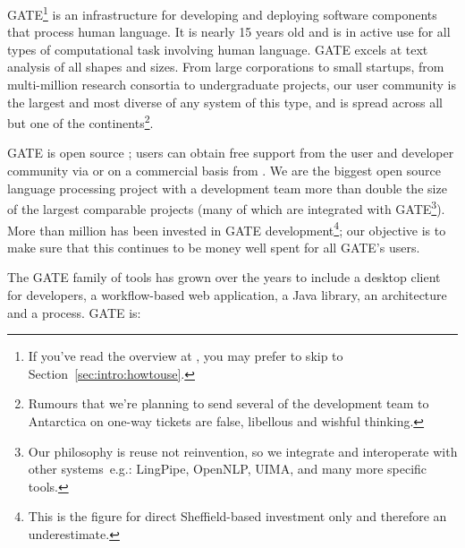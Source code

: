 GATE\footnote{If you've read
the overview at , 
you may prefer to skip to Section~\ref{sec:intro:howtouse}.} is an
infrastructure for developing and deploying software components that
process human language. It is nearly 15 years old and is in active use
for all types of computational task involving human language. GATE
excels at text analysis of all shapes and sizes. From large
corporations to small startups, from \texteuro multi-million research
consortia to undergraduate projects, our user community is the largest
and most diverse of any system of this type, and is spread across all
but one of the continents\footnote{Rumours that we're planning to send
several of the development team to Antarctica on one-way tickets are
false, libellous and wishful thinking.}.

GATE is open source ; users
can obtain free support from the user and developer community
via  or on a commercial basis
from . We are the
biggest open source language processing project with a development
team more than double the size of the largest comparable projects
(many of which are integrated with GATE\footnote{Our philosophy is
reuse not reinvention, so we integrate and interoperate with other
systems\, e.g.: LingPipe, OpenNLP, UIMA, and many more specific
tools.}). More than  million has been invested in GATE
development\footnote{This is the figure for direct Sheffield-based
investment only and therefore an underestimate.}; our objective is to
make sure that this continues to be money well spent for all GATE's
users.

The GATE family of tools has grown over the years to include a desktop client for developers, a
workflow-based web application, a Java library, an architecture and a process.
GATE is:

